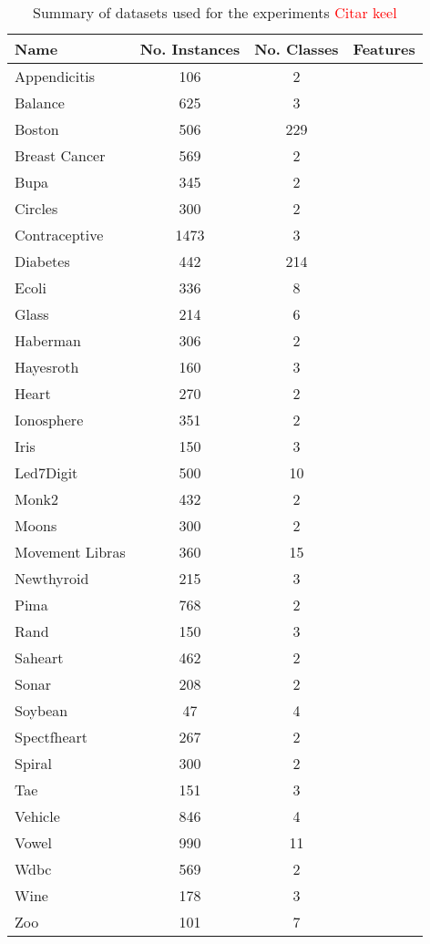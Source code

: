 \documentclass[review]{elsarticle}
\begin{document}
\begin{table}[!h]
	\centering
	\setlength{\tabcolsep}{5pt}
	\renewcommand{\arraystretch}{0.8}
	\small
	\begin{tabular}{l c c c}
		\hline
		Name & No. Instances & No. Classes & Features \\
		\hline
		Appendicitis & 106 & 2 &  \\
		Balance & 625 & 3 &  \\
		Boston & 506 & 229 &  \\
		Breast Cancer & 569 & 2 &  \\
		Bupa & 345 & 2 &  \\
		Circles & 300 & 2 &  \\
		Contraceptive & 1473 & 3 &  \\
		Diabetes & 442 & 214 &  \\
		Ecoli & 336 & 8 &  \\
		Glass & 214 & 6 &  \\
		Haberman & 306 & 2 &  \\
		Hayesroth & 160 & 3 &  \\
		Heart & 270 & 2 &  \\
		Ionosphere & 351 & 2 &  \\
		Iris & 150 & 3 &  \\
		Led7Digit & 500 & 10 &  \\
		Monk2 & 432 & 2 &  \\
		Moons & 300 & 2 &  \\
		Movement Libras & 360 & 15 &  \\
		Newthyroid & 215 & 3 &  \\
		Pima & 768 & 2 &  \\
		Rand & 150 & 3 &  \\
		Saheart & 462 & 2 &  \\
		Sonar & 208 & 2 &  \\
		Soybean & 47 & 4 &  \\
		Spectfheart & 267 & 2 &  \\
		Spiral & 300 & 2 &  \\
		Tae & 151 & 3 &  \\
		Vehicle & 846 & 4 &  \\
		Vowel & 990 & 11 &  \\
		Wdbc & 569 & 2 &  \\
		Wine & 178 & 3 &  \\
		Zoo & 101 & 7 &  \\
		\hline

	\end{tabular}%
	\caption{Summary of datasets used for the experiments \textcolor{red}{Citar keel}}
	\label{tab:datasets}
\end{table}
\end{document}
